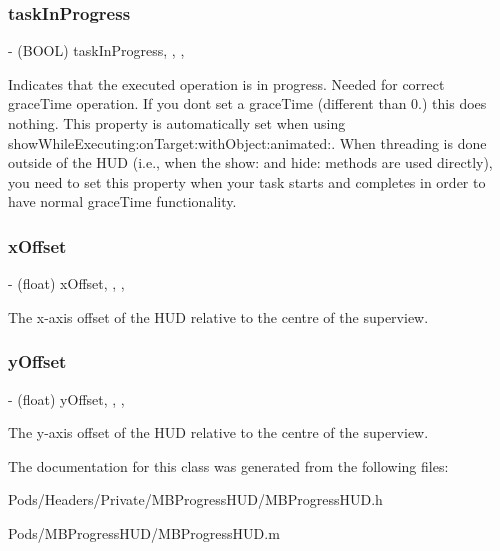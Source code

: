 \subsubsection{\texorpdfstring{task\+In\+Progress}{taskInProgress}}
{\footnotesize\ttfamily -\/ (B\+O\+OL) task\+In\+Progress\hspace{0.3cm}{\ttfamily [read]}, {\ttfamily [write]}, {\ttfamily [atomic]}, {\ttfamily [assign]}}

Indicates that the executed operation is in progress. Needed for correct grace\+Time operation. If you don\textquotesingle{}t set a grace\+Time (different than 0.) this does nothing. This property is automatically set when using show\+While\+Executing\+:on\+Target\+:with\+Object\+:animated\+:. When threading is done outside of the H\+UD (i.\+e., when the show\+: and hide\+: methods are used directly), you need to set this property when your task starts and completes in order to have normal grace\+Time functionality. \mbox{\label{interface_m_b_progress_h_u_d_a4e6ee114c04b90ced1a253a6d33ba785}} 
\subsubsection{\texorpdfstring{x\+Offset}{xOffset}}
{\footnotesize\ttfamily -\/ (float) x\+Offset\hspace{0.3cm}{\ttfamily [read]}, {\ttfamily [write]}, {\ttfamily [atomic]}, {\ttfamily [assign]}}

The x-\/axis offset of the H\+UD relative to the centre of the superview. \mbox{\label{interface_m_b_progress_h_u_d_ad526ffcabab5131697eb0850c50ab1f4}} 
\subsubsection{\texorpdfstring{y\+Offset}{yOffset}}
{\footnotesize\ttfamily -\/ (float) y\+Offset\hspace{0.3cm}{\ttfamily [read]}, {\ttfamily [write]}, {\ttfamily [atomic]}, {\ttfamily [assign]}}

The y-\/axis offset of the H\+UD relative to the centre of the superview. 

The documentation for this class was generated from the following files\+:\begin{DoxyCompactItemize}
\item 
Pods/\+Headers/\+Private/\+M\+B\+Progress\+H\+U\+D/M\+B\+Progress\+H\+U\+D.\+h\item 
Pods/\+M\+B\+Progress\+H\+U\+D/M\+B\+Progress\+H\+U\+D.\+m\end{DoxyCompactItemize}
